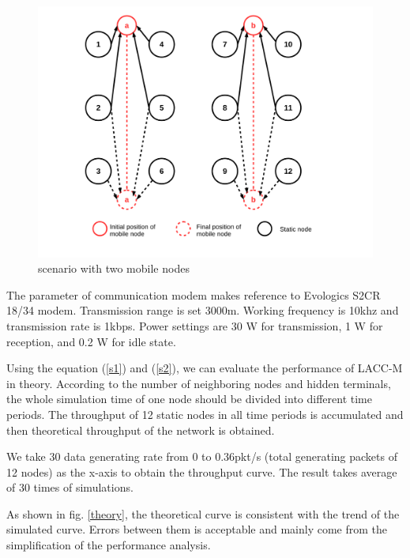 \documentclass[conference]{IEEEtran}
\begin{document}
\begin{figure}[!h]
	\centering
	\includegraphics[scale=0.25]{figures/2scen.pdf}
	\caption{
		scenario with two mobile nodes
	}
	\label{2scen}
\end{figure}

The parameter of communication modem makes reference to Evologics S2CR 18/34 modem. Transmission range is set 3000m. Working frequency is 10khz and transmission rate is 1kbps. Power settings are 30 W for transmission, 1 W for reception, and 0.2 W for idle state.


Using the equation (\ref{s1}) and (\ref{s2}), we can evaluate the performance of LACC-M in theory. According to the number of neighboring nodes and hidden terminals, the whole simulation time of one node should be divided into different time periods. The throughput of 12 static nodes in all time periods is accumulated and then theoretical throughput of the network is obtained.

We take 30 data generating rate from 0 to 0.36pkt/s (total generating packets of 12 nodes) as the x-axis to obtain the throughput curve. The result takes average of 30 times of simulations.

As shown in fig. \ref{theory}, the theoretical curve is consistent with the trend of the simulated curve. Errors between them is acceptable and mainly come from the simplification of the performance analysis.
\end{document}
